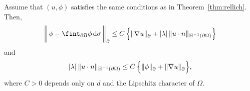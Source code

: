 \begin{lem}
  \label{lem:neumannDirichlet}
  Assume that $(u,\phi)$ satisfies the same conditions as in Theorem~\ref{thm:rellich}.
  Then,
  \begin{align}
    \label{eq:phiDashintPhi}
    \bigg\|\, \phi - \fint_{\partial\Omega} \phi \d\sigma \, \bigg\|^{}_\partial 
    \leq C\, \Big\{ \|\nabla u\|^{}_\partial + |\lambda| \, \|u\cdot n\|_{\HH^{-1}(\partial\Omega)} \Big\}
  \end{align}
  and
  \begin{align}
    \label{eq:lambdaun}
    |\lambda|\, \| u\cdot n \|_{\mathrm{H}^{-1}(\partial\Omega)} \leq C\, \Big\{ \|\phi\|^{}_\partial + \|\nabla u\|^{}_\partial \Big\},
  \end{align}
  where $C > 0$ depends only on $d$ and the Lipschitz character of $\Omega$.
\end{lem}

